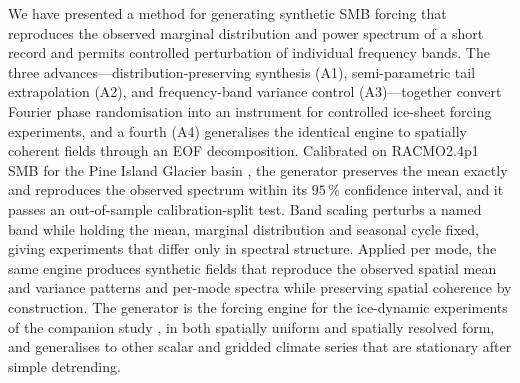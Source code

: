 \conclusions

We have presented a method for generating synthetic SMB forcing that
reproduces the observed marginal distribution and power spectrum of a short
record and permits controlled perturbation of individual frequency bands.
The three advances---distribution-preserving synthesis (A1), semi-parametric
tail extrapolation (A2), and frequency-band variance control (A3)---together
convert Fourier phase randomisation into an instrument for controlled
ice-sheet forcing experiments, and a fourth (A4) generalises the identical
engine to spatially coherent fields through an EOF decomposition. Calibrated
on RACMO2.4p1 SMB for the Pine Island Glacier basin \citep{vandalum2025}, the
generator preserves the mean exactly and reproduces the observed spectrum
within its $95\,\%$ confidence interval, and it passes an out-of-sample
calibration-split test. Band scaling perturbs a named band while holding the
mean, marginal distribution and seasonal cycle fixed, giving experiments that
differ only in spectral structure. Applied per mode, the same engine produces
synthetic fields that reproduce the observed spatial mean and variance
patterns and per-mode spectra while preserving spatial coherence by
construction. The generator is the forcing engine for the ice-dynamic
experiments of the companion study \citep{markovsky_inprep}, in both
spatially uniform and spatially resolved form, and generalises to other
scalar and gridded climate series that are stationary after simple
detrending.






